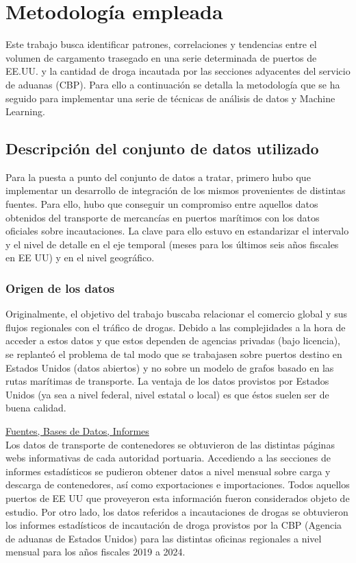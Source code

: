 \documentclass[12pt]{article}
\begin{document}
\newpage
	
\section{Metodología empleada}	
Este trabajo busca identificar patrones, correlaciones y tendencias entre el volumen de cargamento trasegado en una serie determinada de puertos de EE.UU. y la cantidad de droga incautada por las secciones adyacentes del servicio de aduanas (CBP). Para ello a continuación se detalla la metodología que se ha seguido para implementar una serie de técnicas de análisis de datos y Machine Learning.

	\subsection{Descripción del conjunto de datos utilizado}
	Para la puesta a punto del conjunto de datos a tratar, primero hubo que implementar un desarrollo de integración de los mismos provenientes de distintas fuentes.
	Para ello, hubo que conseguir un compromiso entre aquellos datos obtenidos del transporte de mercancías en puertos marítimos con los datos oficiales sobre incautaciones. La clave para ello estuvo en estandarizar el intervalo y el nivel de detalle en el eje temporal (meses para los últimos seis años fiscales en EE UU) y en el nivel geográfico.
	
		\subsubsection{\label{data origin}Origen de los datos}
		Originalmente, el objetivo del trabajo buscaba relacionar el comercio global y sus flujos regionales con el tráfico de drogas. Debido a las complejidades a la hora de acceder a estos datos y que estos dependen de agencias privadas (bajo licencia), se replanteó el problema de tal modo que se trabajasen sobre puertos destino en Estados Unidos (datos abiertos) y no sobre un modelo de grafos basado en las rutas marítimas de transporte. La ventaja de los datos provistos por Estados Unidos (ya sea a nivel federal, nivel estatal o local) es que éstos suelen ser de buena calidad.
		
		\underline{Fuentes, Bases de Datos, Informes}\\
		Los datos de transporte de contenedores se obtuvieron de las distintas páginas webs informativas de cada autoridad portuaria. Accediendo a las secciones de informes estadísticos se pudieron obtener datos a nivel mensual sobre carga y descarga de contenedores, así como exportaciones e importaciones. Todos aquellos puertos de EE UU que proveyeron esta información fueron considerados objeto de estudio. Por otro lado, los datos referidos a incautaciones de drogas se obtuvieron los informes estadísticos de incautación de droga provistos por la CBP (Agencia de aduanas de Estados Unidos) para las distintas oficinas regionales a nivel mensual para los años fiscales 2019 a 2024.
		
\end{document}
